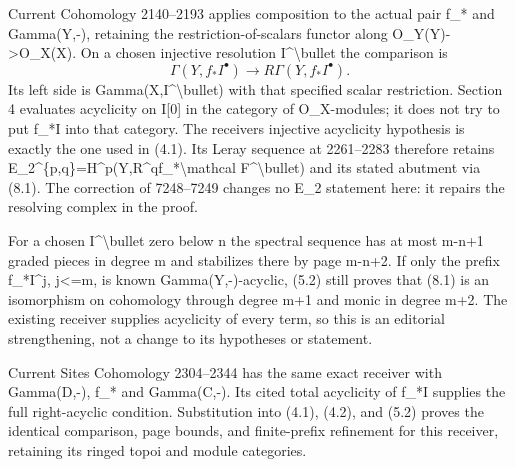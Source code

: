 Current Cohomology 2140–\allowbreak{}2193 applies composition to the actual pair f\_\allowbreak{}* and Gamma(Y,\allowbreak{}-)\allowbreak{},\allowbreak{} retaining the restriction-of-scalars functor along O\_\allowbreak{}Y(Y)\allowbreak{}\allowbreak{}->O\_\allowbreak{}X(X)\allowbreak{}. On a chosen injective resolution I\^{}\textbackslash bullet the comparison is \[
 \Gamma(Y,f_*I^\bullet)
     \longrightarrow R\Gamma(Y,f_*I^\bullet).
                                                               \tag{8.1}
\] Its left side is Gamma(X,\allowbreak{}I\textasciicircum{}\textbackslash{}bullet)\allowbreak{} with that specified scalar restriction. Section 4 evaluates acyclicity on I[0]\allowbreak{} in the category of O\_\allowbreak{}X-modules; it does not try to put f\_\allowbreak{}*I into that category. The receiver\textquotesingle s injective acyclicity hypothesis is exactly the one used in (4.1)\allowbreak{}. Its Leray sequence at 2261–\allowbreak{}2283 therefore retains E\_\allowbreak{}2\textasciicircum{}\{p,\allowbreak{}q\}\allowbreak{}=H\textasciicircum{}p(Y,\allowbreak{}R\textasciicircum{}qf\_\allowbreak{}*\textbackslash{}mathcal F\textasciicircum{}\textbackslash{}bullet)\allowbreak{} and its stated abutment via (8.1)\allowbreak{}. The correction of 7248–\allowbreak{}7249 changes no E\_\allowbreak{}2 statement here:\allowbreak{} it repairs the resolving complex in the proof.

For a chosen I\^{}\textbackslash bullet zero below n the spectral sequence has at most m-n\allowbreak{}+1 graded pieces in degree m and stabilizes there by page m-n\allowbreak{}+2. If only the prefix f\_\allowbreak{}*I\textasciicircum{}j,\allowbreak{} j<\allowbreak{}=m,\allowbreak{} is known Gamma(Y,\allowbreak{}-)\allowbreak{}-acyclic,\allowbreak{} (5.2)\allowbreak{} still proves that (8.1)\allowbreak{} is an isomorphism on cohomology through degree m\allowbreak{}+1 and monic in degree m\allowbreak{}+2. The existing receiver supplies acyclicity of every term,\allowbreak{} so this is an editorial strengthening,\allowbreak{} not a change to its hypotheses or statement.

Current Sites Cohomology 2304–\allowbreak{}2344 has the same exact receiver with Gamma(D,\allowbreak{}-)\allowbreak{},\allowbreak{} f\_\allowbreak{}* and Gamma(C,\allowbreak{}-)\allowbreak{}. Its cited total acyclicity of f\_\allowbreak{}*I supplies the full right-acyclic condition. Substitution into (4.1)\allowbreak{},\allowbreak{} (4.2)\allowbreak{},\allowbreak{} and (5.2)\allowbreak{} proves the identical comparison,\allowbreak{} page bounds,\allowbreak{} and finite-prefix refinement for this receiver,\allowbreak{} retaining its ringed topoi and module categories.


